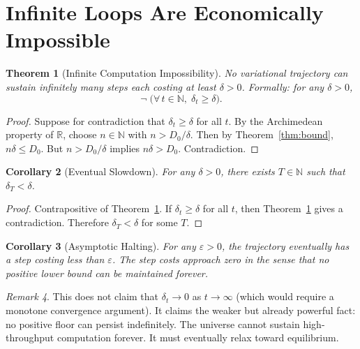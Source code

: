 \documentclass[11pt,a4paper]{article}
\theoremstyle{plain}
\newtheorem{theorem}{Theorem}[section]
\newtheorem{corollary}[theorem]{Corollary}
\theoremstyle{definition}
\theoremstyle{remark}
\newtheorem{remark}[theorem]{Remark}
\newcommand{\R}{\mathbb{R}}
\newcommand{\N}{\mathbb{N}}
\begin{document}
\section{Infinite Loops Are Economically Impossible}\label{sec:impossible}

\begin{theorem}[Infinite Computation Impossibility]\label{thm:impossible}
No variational trajectory can sustain infinitely many steps each costing at least $\delta > 0$.
Formally: for any $\delta > 0$,
\[
\neg\;\bigl(\forall\, t \in \N,\; \delta_t \ge \delta\bigr).
\]
\end{theorem}

\begin{proof}
Suppose for contradiction that $\delta_t \ge \delta$ for all $t$.
By the Archimedean property of $\R$, choose $n \in \N$ with $n > D_0/\delta$.
Then by Theorem~\ref{thm:bound}, $n\delta \le D_0$.
But $n > D_0/\delta$ implies $n\delta > D_0$.
Contradiction.
\end{proof}

\begin{corollary}[Eventual Slowdown]\label{cor:slowdown}
For any $\delta > 0$, there exists $T \in \N$ such that $\delta_T < \delta$.
\end{corollary}

\begin{proof}
Contrapositive of Theorem~\ref{thm:impossible}.
If $\delta_t \ge \delta$ for all $t$, then Theorem~\ref{thm:impossible} gives a contradiction.
Therefore $\delta_T < \delta$ for some $T$.
\end{proof}

\begin{corollary}[Asymptotic Halting]\label{cor:asymptotic}
For any $\varepsilon > 0$, the trajectory eventually has a step costing less than $\varepsilon$.
The step costs approach zero in the sense that no positive lower bound can be maintained forever.
\end{corollary}

\begin{remark}
This does not claim that $\delta_t \to 0$ as $t \to \infty$ (which would require a monotone convergence argument).
It claims the weaker but already powerful fact: no positive floor can persist indefinitely.
The universe cannot sustain high-throughput computation forever.
It must eventually relax toward equilibrium.
\end{remark}
\end{document}
